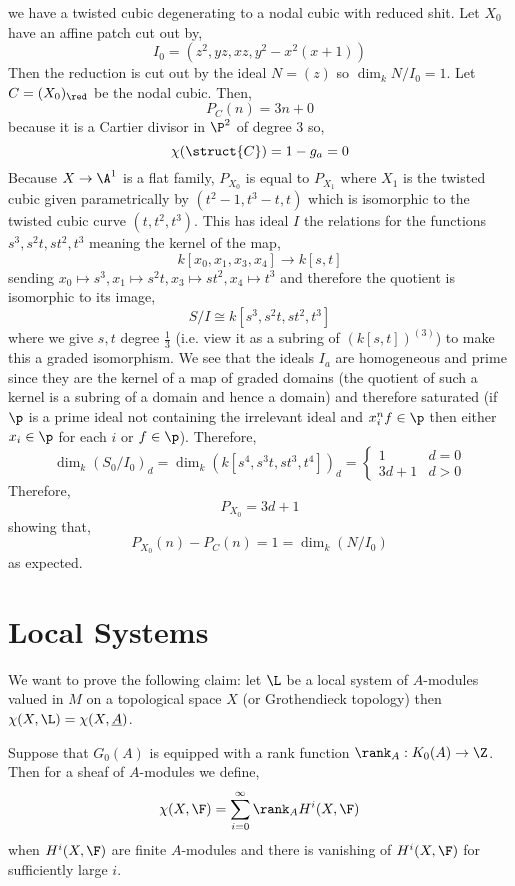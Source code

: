 \documentclass[12pt]{article}
\begin{document}
\begin{example}
[H, Example, 9.8.4] we have a twisted cubic degenerating to a nodal cubic with reduced shit. Let $X_0$ have an affine patch cut out by,
\[ I_0 = (z^2, yz, xz, y^2 - x^2( x + 1)) \]
Then the reduction is cut out by the ideal $N = (z)$ so $\dim_k N/I_0 = 1$. Let $C = (X_0)_{\red}$ be the nodal cubic. Then,
\[ P_C(n) = 3 n + 0 \]
because it is a Cartier divisor in $\P^2$ of degree $3$ so,
\[ \chi(\struct{C}) = 1 - g_a = 0 \]
Because $X \to \A^1$ is a flat family, $P_{X_0}$ is equal to $P_{X_1}$ where $X_1$ is the twisted cubic given parametrically by $(t^2 - 1, t^3 - t, t)$ which is isomorphic to the twisted cubic curve $(t, t^2, t^3)$. This has ideal $I$ the relations for the functions $s^3, s^2 t, s t^2, t^3$   meaning the kernel of the map,
\[ k[x_0, x_1, x_3, x_4] \to k[s,t] \]
sending $x_0 \mapsto s^3, x_1 \mapsto s^2 t, x_3 \mapsto s t^2, x_4 \mapsto t^3$ and therefore the quotient is isomorphic to its image,
\[ S/I \cong k[s^3, s^2 t, s t^2, t^3] \] 
where we give $s,t$ degree $\frac{1}{3}$ (i.e. view it as a subring of $(k[s,t])^{(3)}$) to make this a graded isomorphism. We see that the ideals $I_a$ are homogeneous and prime since they are the kernel of a map of graded domains (the quotient of such a kernel is a subring of a domain and hence a domain) and therefore saturated (if $\p$ is a prime ideal not containing the irrelevant ideal and $x_i^{n} f \in \p$ then either $x_i \in \p$ for each $i$ or $f \in \p$). Therefore,
\[ \dim_{k} (S_0 / I_0)_d = \dim_k (k[s^4, s^3 t, s t^3, t^4])_d = 
\begin{cases}
1 & d = 0
\\
3 d + 1 & d > 0
\end{cases} \]
Therefore,
\[ P_{X_0} = 3 d + 1 \]
showing that,
\[ P_{X_0}(n) - P_C(n) = 1 = \dim_k (N/I_0) \]
as expected. 
\end{example}

\section{Local Systems}


\begin{rmk}
We want to prove the following claim: let $\L$ be a local system of $A$-modules valued in $M$ on a topological space $X$ (or Grothendieck topology) then $\chi(X, \L) = \chi(X, \underline{A})$. 
\end{rmk}

\begin{defn}
Suppose that $G_0(A)$ is equipped with a rank function $\rank_A : K_0(A) \to \Z$. Then for a sheaf of $A$-modules we define,
\[ \chi(X, \F) = \sum_{i = 0}^\infty \rank_A{H^i(X, \F)} \]
when $H^i(X, \F)$ are finite $A$-modules and there is vanishing of $H^i(X, \F)$ for sufficiently large $i$.
\end{defn}
\end{document}
